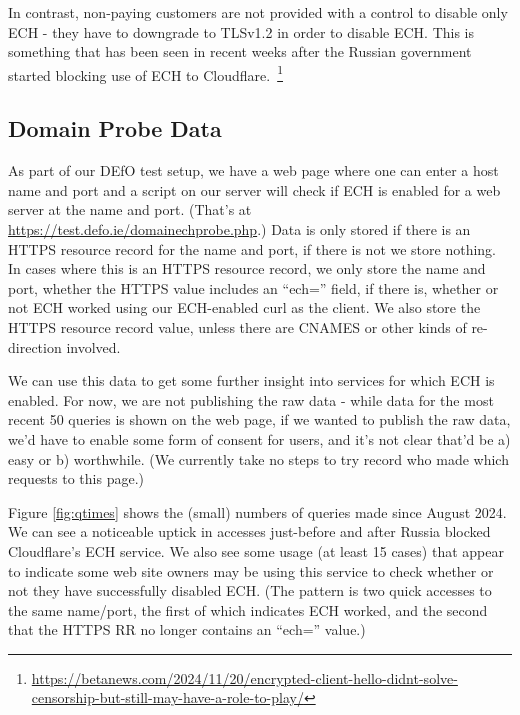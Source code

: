 In contrast, non-paying customers are not provided with a control to disable
only ECH - they have to downgrade to TLSv1.2 in order to disable ECH. This
is something that has been seen in recent weeks after the Russian government
started blocking use of ECH to
Cloudflare.~\footnote{\url{https://betanews.com/2024/11/20/encrypted-client-hello-didnt-solve-censorship-but-still-may-have-a-role-to-play/}}

\subsection{Domain Probe Data}

As part of our DEfO test setup, we have a web page where one can enter a host
name and port and a script on our server will check if ECH is enabled for a web
server at the name and port. (That's at
\url{https://test.defo.ie/domainechprobe.php}.) Data is only stored if there is
an HTTPS resource record for the name and port, if there is not we store
nothing. In cases where this is an HTTPS resource record, we only store the
name and port, whether the HTTPS value includes an ``ech='' field, if there is,
whether or not ECH worked using our ECH-enabled curl as the client. We also
store the HTTPS resource record value, unless there are CNAMES or other
kinds of re-direction involved.

We can use this data to get some further insight into services for which ECH
is enabled. For now, we are not publishing the raw data - while data for the most
recent 50 queries is shown on the web page, if we wanted to publish the raw
data, we'd have to enable some form of consent for users, and it's not clear
that'd be a) easy or b) worthwhile. (We currently take no steps to try record
who made which requests to this page.)

Figure \ref{fig:qtimes} shows the (small) numbers of queries made since August
2024. We can see a noticeable uptick in accesses just-before and after Russia
blocked Cloudflare's ECH service. We also see some usage (at least 15 cases) that
appear to indicate some web site owners may be using this service to check
whether or not they have successfully disabled ECH. (The pattern is two quick
accesses to the same name/port, the first of which indicates ECH worked, and
the second that the HTTPS RR no longer contains an ``ech='' value.)

